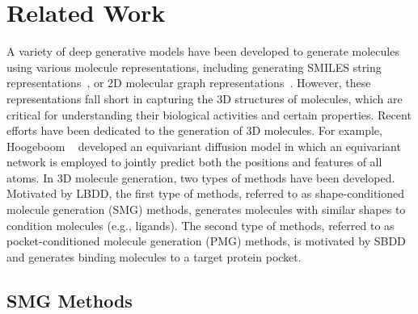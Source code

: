 \section{Related Work}

A variety of deep generative models have been developed to generate molecules using various molecule representations, 
including generating SMILES string representations~\cite{GmezBombarelli2018}, or 2D molecular graph representations~\cite{jin18jtvae,Chen2021modof}.
%
{However, these representations fall short in capturing the 3D structures of molecules, which are critical for understanding their biological activities and certain properties.}
%
Recent efforts have been dedicated to the generation of 3D molecules. 
%
For example, Hoogeboom \etal~\cite{hoogeboom22diff} developed an equivariant diffusion model 
in which an equivariant network is employed to
jointly predict both the positions and features of all atoms.
%
In 3D molecule generation, two types of methods have been developed.
%
Motivated by LBDD, the first type of methods, referred to as shape-conditioned molecule generation (SMG) methods, generates molecules with similar shapes to condition molecules (e.g., ligands).
% 
The second type of methods, referred to as pocket-conditioned molecule generation (PMG) methods, is motivated by SBDD and generates binding molecules to a target protein pocket.
%



\subsection*{SMG Methods}

